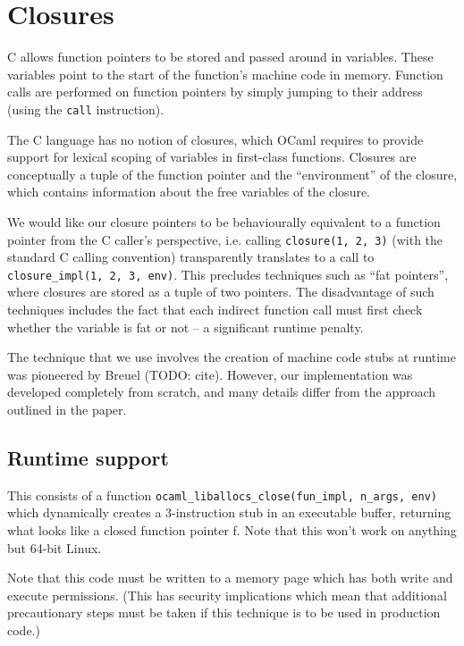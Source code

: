 \documentclass[12pt,a4paper,twoside,openright]{report}
\begin{document}
\section{Closures}

C allows function pointers to be stored and passed around in variables. These variables point to the start of the function's machine code in memory. Function calls are performed on function pointers by simply jumping to their address (using the \lstinline{call} instruction).

The C language has no notion of closures, which OCaml requires to provide support for lexical scoping of variables in first-class functions. Closures are conceptually a tuple of the function pointer and the ``environment'' of the closure, which contains information about the free variables of the closure.

We would like our closure pointers to be behaviourally equivalent to a function pointer from the C caller's perspective, i.e. calling
\lstinline{closure(1, 2, 3)}
(with the standard C calling convention) transparently translates to a call to
\lstinline{closure_impl(1, 2, 3, env)}. This precludes techniques such as ``fat pointers'', where closures are stored as a tuple of two pointers. The disadvantage of such techniques includes the fact that each indirect function call must first check whether the variable is fat or not -- a significant runtime penalty.

The technique that we use involves the creation of machine code stubs at runtime was pioneered by Breuel (TODO: cite). However, our implementation was developed completely from scratch, and many details differ from the approach outlined in the paper.

\subsection{Runtime support}

This consists of a function \lstinline{ocaml_liballocs_close(fun_impl, n_args, env)}
which dynamically creates a 3-instruction stub in an executable buffer,
returning what looks like a closed function pointer f. Note that this won't work on anything but 64-bit Linux.

Note that this code must be written to a memory page which has both write and execute permissions. (This has security implications which mean that additional precautionary steps must be taken if this technique is to be used in production code.)
\end{document}
